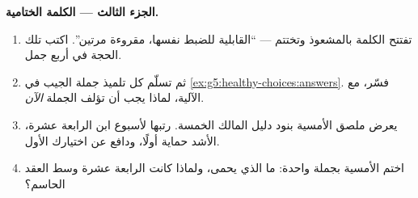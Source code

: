 \begin{problem}
\medskip\noindent\textbf{الجزء الثالث --- الكلمة
الختامية.}
\begin{enumerate}[resume]
  \item تفتتح الكلمة بالمشعوذ وتختتم  ---
        ``القابلية للضبط نفسها، مقروءة مرتين''. اكتب
        تلك الحجة في أربع جمل.
  \item ثم تسلّم كل تلميذ جملة الجيب في
        \cref{ex:g5:healthy-choices:answers}. فسّر، مع
        الآلية، لماذا يجب أن تؤلف الجملة \emph{الآن}.
  \item يعرض ملصق الأمسية بنود دليل المالك الخمسة.
        رتبها لأسبوع ابن الرابعة عشرة، الأشد حماية
        أولًا، ودافع عن اختيارك الأول.
  \item اختم الأمسية بجملة واحدة: ما الذي يحمى، ولماذا
        كانت الرابعة عشرة وسط العقد الحاسم؟
\end{enumerate}
\end{problem}
